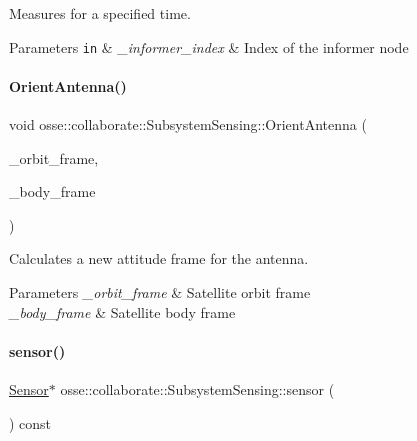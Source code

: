 Measures for a specified time. 


\begin{DoxyParams}[1]{Parameters}
\mbox{\tt in}  & {\em \+\_\+informer\+\_\+index} & Index of the informer node \\
\hline
\end{DoxyParams}
\mbox{\label{classosse_1_1collaborate_1_1_subsystem_sensing_abd60540872a1fad85bf8ec99e82f1e4d}} 
\paragraph{\texorpdfstring{Orient\+Antenna()}{OrientAntenna()}}
{\footnotesize\ttfamily void osse\+::collaborate\+::\+Subsystem\+Sensing\+::\+Orient\+Antenna (\begin{DoxyParamCaption}\item[{const \hyperlink{classosse_1_1collaborate_1_1_reference_frame}{Reference\+Frame} \&}]{\+\_\+orbit\+\_\+frame,  }\item[{const \hyperlink{classosse_1_1collaborate_1_1_reference_frame}{Reference\+Frame} \&}]{\+\_\+body\+\_\+frame }\end{DoxyParamCaption})}



Calculates a new attitude frame for the antenna. 


\begin{DoxyParams}{Parameters}
{\em \+\_\+orbit\+\_\+frame} & Satellite orbit frame \\
\hline
{\em \+\_\+body\+\_\+frame} & Satellite body frame \\
\hline
\end{DoxyParams}
\mbox{\label{classosse_1_1collaborate_1_1_subsystem_sensing_acab2a1de4777a5ef9552dc8823949a1b}} 
\paragraph{\texorpdfstring{sensor()}{sensor()}}
{\footnotesize\ttfamily \hyperlink{classosse_1_1collaborate_1_1_sensor}{Sensor}$\ast$ osse\+::collaborate\+::\+Subsystem\+Sensing\+::sensor (\begin{DoxyParamCaption}{ }\end{DoxyParamCaption}) const\hspace{0.3cm}{\ttfamily [inline]}}



